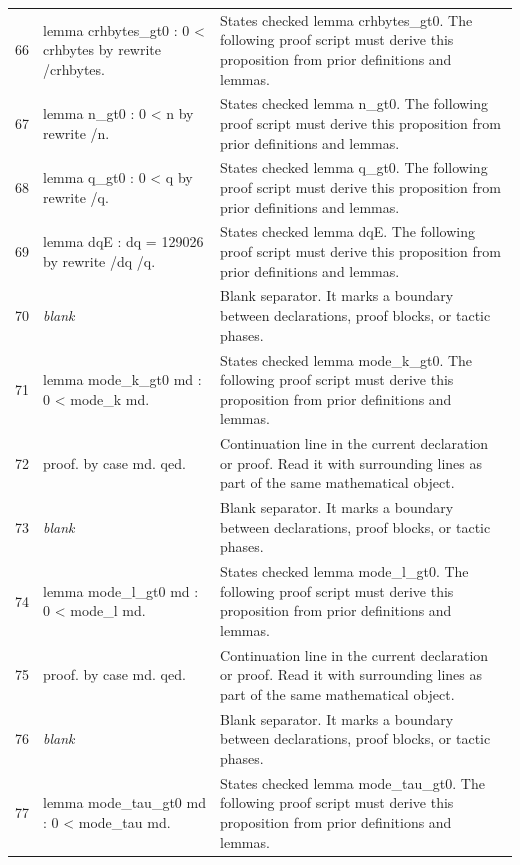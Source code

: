 \documentclass[10pt]{article}
\begin{document}
\begin{longtable}{r L{0.53\textwidth} L{0.37\textwidth}}
66 & {\ttfamily\scriptsize lemma crhbytes\_gt0 : 0 < crhbytes by rewrite /crhbytes.} & States checked lemma crhbytes\_gt0.  The following proof script must derive this proposition from prior definitions and lemmas. \\
67 & {\ttfamily\scriptsize lemma n\_gt0 : 0 < n by rewrite /n.} & States checked lemma n\_gt0.  The following proof script must derive this proposition from prior definitions and lemmas. \\
68 & {\ttfamily\scriptsize lemma q\_gt0 : 0 < q by rewrite /q.} & States checked lemma q\_gt0.  The following proof script must derive this proposition from prior definitions and lemmas. \\
69 & {\ttfamily\scriptsize lemma dqE : dq = 129026 by rewrite /dq /q.} & States checked lemma dqE.  The following proof script must derive this proposition from prior definitions and lemmas. \\
70 & {\ttfamily\scriptsize \emph{blank}} & Blank separator.  It marks a boundary between declarations, proof blocks, or tactic phases. \\
71 & {\ttfamily\scriptsize lemma mode\_k\_gt0 md : 0 < mode\_k md.} & States checked lemma mode\_k\_gt0.  The following proof script must derive this proposition from prior definitions and lemmas. \\
72 & {\ttfamily\scriptsize proof. by case md. qed.} & Continuation line in the current declaration or proof.  Read it with surrounding lines as part of the same mathematical object. \\
73 & {\ttfamily\scriptsize \emph{blank}} & Blank separator.  It marks a boundary between declarations, proof blocks, or tactic phases. \\
74 & {\ttfamily\scriptsize lemma mode\_l\_gt0 md : 0 < mode\_l md.} & States checked lemma mode\_l\_gt0.  The following proof script must derive this proposition from prior definitions and lemmas. \\
75 & {\ttfamily\scriptsize proof. by case md. qed.} & Continuation line in the current declaration or proof.  Read it with surrounding lines as part of the same mathematical object. \\
76 & {\ttfamily\scriptsize \emph{blank}} & Blank separator.  It marks a boundary between declarations, proof blocks, or tactic phases. \\
77 & {\ttfamily\scriptsize lemma mode\_tau\_gt0 md : 0 < mode\_tau md.} & States checked lemma mode\_tau\_gt0.  The following proof script must derive this proposition from prior definitions and lemmas. \\

\end{longtable}
\end{document}

